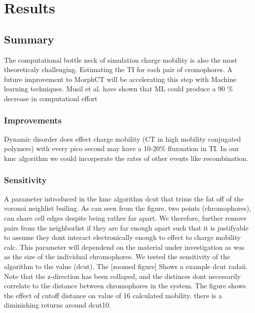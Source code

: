 \chapter{Results}
\label{chap:results}

\section{Summary}

\indent The computational bottle neck of simulation charge mobility is also the most theoreticaly challenging.
Estimating the TI for each pair of cromophores. A future improvement to MorphCT will be accelerating this step
with Machine learning techniques. Musil et al. have shown that ML could produce a 90 \% decrease in
computationl effort \cite{Musil2018}
\subsection{Improvements}
Dynamic disorder does effect charge mobility (CT in high mobility conjugated polymers) with every pico second
may have a 10-20\% fluxuation in TI. 
In our kmc algorithm we could incorperate the rates of other events like recombination.
\subsection{Sensitivity}
A parameter introduced in the kmc algorithm dcut that trims the fat off of the voronoi neighlist builing.
As can seen from the figure, two points (chromophores), can share cell edges despite being rather far apart. We
therefore, further remove pairs from the neighborlist if they are far enough apart such that it is justifyable
to assume they dont interact electronically enough to effect to charge mobility calc. This parameter will
dependend on the material under investigation as was as the size of the individual chromophores. We tested the
sensitivity of the algorithm to the value (dcut). The [zoomed figure] Shows a example dcut radaii. Note that
the z-direction has been collaped, and the distinces dont necessarily correlate to the distance
between chromophores in the system. The figure shows the effect of cutoff distance on value of
16 calculated mobility. there is a diminishing returns around dcut10.

